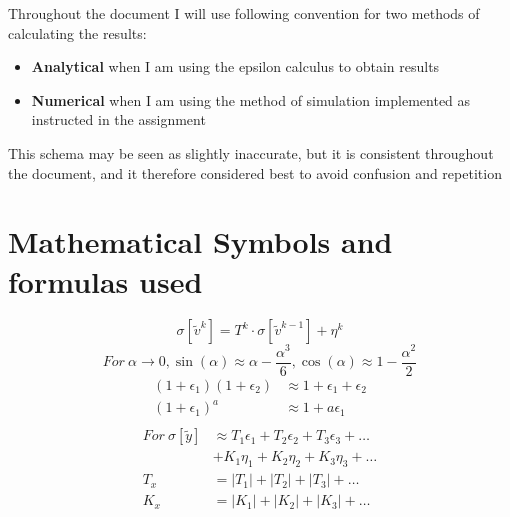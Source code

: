 \documentclass[11pt]{article}
\begin{document}
Throughout the document I will use following convention for two methods of
calculating the results:
\begin{itemize}
    \item \textbf{Analytical} when I am using the epsilon calculus to obtain results \\
    \item \textbf{Numerical} when I am using the method of simulation implemented as instructed in the assignment \\
\end{itemize}
This schema may be seen as slightly inaccurate, but it is consistent throughout 
the document, and it therefore considered best to avoid confusion and repetition

\section{Mathematical Symbols and formulas used}
\begin{equation}
    \sigma [\tilde{v}^k] = T^k \cdot \sigma[\tilde{v}^{k-1}] + \eta^k
    \label{eq:generaleq}
\end{equation}
\begin{equation}
    For\ \alpha \to 0,\sin(\alpha)\approx\alpha -\frac{\alpha^3}{6},\cos(\alpha)\approx 1-\frac{\alpha^2}{2}
    \label{eq:trigapprox}
\end{equation}
\begin{equation}
    \begin{align}
        (1+\epsilon_1)(1+\epsilon_2) &\approx 1 + \epsilon_1 + \epsilon_2 \\
        (1+\epsilon_1)^a &\approx 1 + a\epsilon_1 \\
    \end{align}
    \label{eq:epsilonapprox}
\end{equation}
\begin{equation}
    \begin{align}
        For\ \sigma[\tilde{y}] &\approx 
        T_1\epsilon_1 +  T_2\epsilon_2 +  T_3\epsilon_3 + \dots  \\
        & + K_1\eta_1 +  K_2\eta_2 +  K_3\eta_3 + \dots \\
        T_x &= \left|T_1\right| + \left|T_2\right| + \left|T_3\right| + \dots \\
        K_x &= \left|K_1\right| + \left|K_2\right| + \left|K_3\right| + \dots \\
    \end{align}
    \label{eq:approxerrors}
\end{equation}
\end{document}
